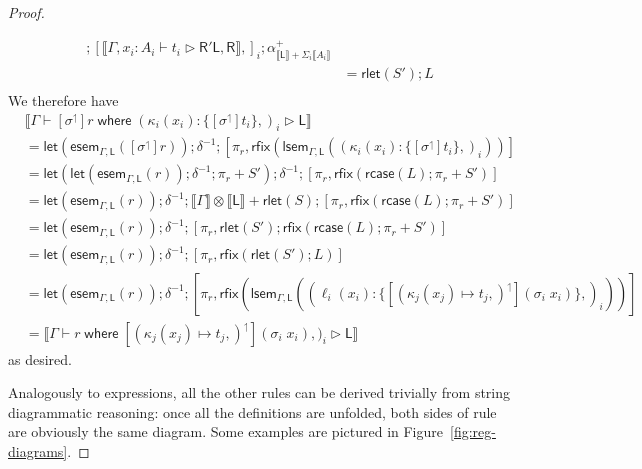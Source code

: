 \documentclass[acmsmall,screen,review]{acmart}
\newcommand{\ms}[1]{\ensuremath{\mathsf{#1}}}
\newcommand{\lto}{:}
\newcommand{\where}[2]{#1\;\ms{where}\;#2}
\newcommand{\wbranch}[3]{#1(#2) \lto \{#3\}}
\newcommand{\lupg}[1]{{#1}^\upharpoonleft}
\newcommand{\bhyp}[2]{#1 : #2}
\newcommand{\haslb}[3]{#1 \vdash #2 \rhd #3}
\newcommand{\dnt}[1]{\llbracket{#1}\rrbracket}
\newcommand{\entrymor}[3]{\ms{esem}_{#1, #3}(#2)}
\newcommand{\loopmor}[3]{\ms{lsem}_{#1, #3}(#2)}
\newcommand{\lmor}[1]{\ms{let}(#1)}
\newcommand{\rlmor}[1]{\ms{rlet}(#1)}
\newcommand{\rcase}[1]{\ms{rcase}(#1)}
\newcommand{\rfix}[1]{\ms{rfix}(#1)}
\begin{document}
\begin{proof}
\begin{itemize}[leftmargin=*]
\begin{equation}
\begin{aligned}
          ; [\dnt{\haslb{\Gamma, \bhyp{x_i}{A_i}}{t_i}{\ms{R}'}{\ms{L}, \ms{R}}},]_i
          ; \alpha^+_{\dnt{\ms{L}} + \Sigma_i \dnt{A_i}} \\
        & = \rlmor{S'} ; L \\
      \end{aligned}
    \end{equation}
    We therefore have
    \begin{equation}
      \begin{aligned}
        & \dnt{\haslb{\Gamma}
          {\where{[\lupg{\sigma}]r}{(\wbranch{\kappa_i}{x_i}{[\lupg{\sigma}]t_i},)_i}}
          {\ms{L}}} \\
        & = \lmor{\entrymor{\Gamma}{[\lupg{\sigma}]r}{\ms{L}}} ; \delta^{-1} ; [\pi_r,
          \rfix{\loopmor{\Gamma}{(\wbranch{\kappa_i}{x_i}{[\lupg{\sigma}]t_i},)_i}{\ms{L}}}] \\
        & = \lmor{\lmor{\entrymor{\Gamma}{r}{\ms{L}}} ; \delta^{-1} ; \pi_r + S'} ; \delta^{-1}
          ; [
              \pi_r,
              \rfix{\rcase{L} ; \pi_r + S'}
          ] \\
        & = \lmor{\entrymor{\Gamma}{r}{\ms{L}}} ; \delta^{-1} 
          ; \dnt{\Gamma} \otimes \dnt{\ms{L}} + \rlmor{S}
          ; [
            \pi_r,
            \rfix{\rcase{L} ; \pi_r + S'}
          ] \\
        & = \lmor{\entrymor{\Gamma}{r}{\ms{L}}} ; \delta^{-1} 
        ; [
          \pi_r,
          \rlmor{S'}
          ; \rfix{\rcase{L} ; \pi_r + S'}
        ] \\
        & = \lmor{\entrymor{\Gamma}{r}{\ms{L}}} ; \delta^{-1} 
        ; [
          \pi_r,
          \rfix{\rlmor{S'} ; L}
        ] \\
        & = \lmor{\entrymor{\Gamma}{r}{\ms{L}}} ; \delta^{-1} 
        ; [
          \pi_r,
          \rfix{
            \loopmor{\Gamma}{(\wbranch{\ell_i}{x_i}
                    {[\lupg{(\kappa_j(x_j) \mapsto t_j,)}](\sigma_i\;x_i)},)_i}{\ms{L}}}
        ] \\
        & = \dnt{\haslb{\Gamma}
          {\where{r}{[\lupg{(\kappa_j(x_j) \mapsto t_j,)}](\sigma_i\;x_i)},)_i}{\ms{L}}}
      \end{aligned}
    \end{equation}
    as desired.
  \end{itemize}
  Analogously to expressions, all the other rules can be derived trivially from string diagrammatic
  reasoning: once all the definitions are unfolded, both sides of rule are obviously the same
  diagram. Some examples are pictured in Figure~\ref{fig:reg-diagrams}.
\end{proof}
\end{document}
